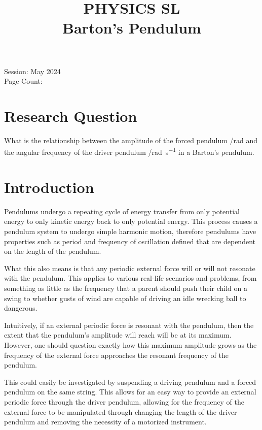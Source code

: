 \documentclass[letterpaper, 12pt]{article}
\title{PHYSICS SL
\\
Barton's Pendulum}
\author{}
\date{}
\begin{document}
\nocite{*}

\maketitle
\begin{center}
    Session: May 2024
    \\
    Page Count:
\end{center}
\newpage

\tableofcontents
\newpage

\setcounter{page}{1}

\section{Research Question}

What is the relationship between the amplitude of
the forced pendulum /\unit{rad} and the
angular frequency of the driver pendulum /\unit{rad.s^{-1}} in a Barton's pendulum.

\section{Introduction}

Pendulums undergo a repeating cycle of energy transfer from
only potential energy to only kinetic energy back to
only potential energy. This process causes
a pendulum system to undergo simple harmonic motion,
therefore pendulums have properties such as
period and frequency of oscillation defined
that are dependent on the length of the pendulum.

What this also means is that any periodic
external force will or will not resonate with
the pendulum. This applies to various real-life
scenarios and problems, from something as little
as the frequency that a parent should push
their child on a swing to whether gusts
of wind are capable of driving an idle wrecking ball
to dangerous.

Intuitively, if an external periodic force
is resonant with the pendulum, then the extent
that the pendulum's amplitude will reach
will be at its maximum. However, one should question exactly
how this maximum amplitude grows as the frequency
of the external force approaches the resonant frequency
of the pendulum.

This could easily be investigated by suspending
a driving pendulum and a forced pendulum on
the same string. This allows for an easy way
to provide an external periodic force through
the driver pendulum, allowing for the frequency
of the external force to be manipulated through
changing the length of the driver pendulum and
removing the necessity of a motorized
instrument.
\end{document}
